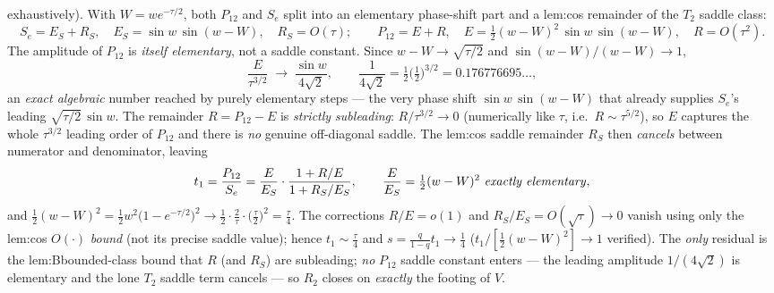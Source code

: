 \begin{remark}
exhaustively). With $W=we^{-\tau/2}$, both $P_{12}$ and $S_e$ split into an elementary phase-shift part and a
lem:cos remainder of the $T_2$ saddle class:
\[
   S_e=E_S+R_S,\quad E_S=\sin w\,\sin(w-W),\quad R_S=O(\tau);\qquad
   P_{12}=E+R,\quad E=\tfrac12(w-W)^2\,\sin w\,\sin(w-W),\quad R=O(\tau^2).
\]
The amplitude of $P_{12}$ is \emph{itself elementary}, not a saddle constant. Since $w-W\to\sqrt{\tau/2}$ and
$\sin(w-W)/(w-W)\to1$,
\[
   \frac{E}{\tau^{3/2}}\;\longrightarrow\;\frac{\sin w}{4\sqrt2},\qquad
   \frac1{4\sqrt2}=\tfrac12\bigl(\tfrac12\bigr)^{3/2}=0.176776695\ldots,
\]
an \emph{exact algebraic} number reached by purely elementary steps --- the very phase shift $\sin w\,\sin(w-W)$
that already supplies $S_e$'s leading $\sqrt{\tau/2}\,\sin w$. The remainder $R=P_{12}-E$ is \emph{strictly
subleading}: $R/\tau^{3/2}\to0$ (numerically like $\tau$, i.e.\ $R\sim\tau^{5/2}$), so $E$ captures the whole
$\tau^{3/2}$ leading order of $P_{12}$ and there is \emph{no} genuine off-diagonal saddle. The lem:cos saddle
remainder $R_S$ then \emph{cancels} between numerator and denominator, leaving
\[
   t_1=\frac{P_{12}}{S_e}=\frac{E}{E_S}\cdot\frac{1+R/E}{1+R_S/E_S},\qquad
   \frac{E}{E_S}=\tfrac12(w-W)^2\ \text{\emph{exactly elementary}},
\]
and $\tfrac12(w-W)^2=\tfrac12 w^2\bigl(1-e^{-\tau/2}\bigr)^2\to\tfrac12\cdot\tfrac2\tau\cdot\bigl(\tfrac\tau2\bigr)^2
=\tfrac\tau4$. The corrections $R/E=o(1)$ and $R_S/E_S=O(\sqrt\tau)\to0$ vanish using only the lem:cos
$O(\cdot)$ \emph{bound} (not its precise saddle value); hence $t_1\sim\tfrac\tau4$ and
$s=\tfrac{q}{1-q}t_1\to\tfrac14$ ($t_1/[\tfrac12(w-W)^2]\to1$ verified). The \emph{only} residual is the
lem:Bbounded-class bound that $R$ (and $R_S$) are subleading; \emph{no} $P_{12}$ saddle constant enters --- the
leading amplitude $1/(4\sqrt2)$ is elementary and the lone $T_2$ saddle term cancels --- so $R_2$ closes on
\emph{exactly} the footing of $V$.


\end{remark}
